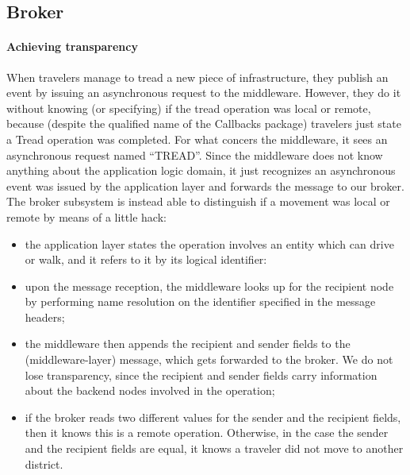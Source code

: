 \subsection{Broker}\label{sec:impl-broker}

\paragraph{Achieving transparency}

When travelers manage to tread a new piece of infrastructure, they publish an
event by issuing an asynchronous request to the middleware. However, they do it
without knowing (or specifying) if the tread operation was local or remote,
because (despite the qualified name of the Callbacks package) travelers just
state a Tread operation was completed.
For what concers the middleware, it sees an asynchronous request named
``TREAD''. Since the middleware does not know anything about the application
logic domain, it just recognizes an asynchronous event was issued by the
application layer and forwards the message to our broker.
The broker subsystem is instead able to distinguish if a movement was local or
remote by means of a little hack:

\begin{itemize}
  \item the application layer states the operation involves an entity which can
  drive or walk, and it refers to it by its logical identifier:
  \item upon the message reception, the middleware looks up for the recipient
    node by performing name resolution on the identifier specified in the
    message headers;
  \item the middleware then appends the recipient and sender fields to the
    (middleware-layer) message, which gets forwarded to the broker. We do not
    lose transparency, since the recipient and sender fields carry information
    about the backend nodes involved in the operation;
  \item if the broker reads two different values for the sender and the
    recipient fields, then it knows this is a remote operation.
    Otherwise, in the
    case the sender and the recipient fields are equal, it knows a traveler did
    not move to another district.
\end{itemize}
